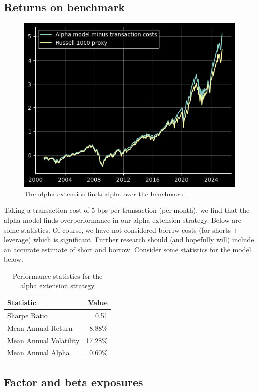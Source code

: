 \documentclass[12pt]{article}
\begin{document}
\subsection{Returns on benchmark}
\begin{figure}[H]
    \centering
    \includegraphics[width=13cm]{./static/returns.png}
    \caption{The alpha extension finds alpha over the benchmark}
    \label{fig:momentum_rank_ic}
\end{figure}
Taking a transaction cost of 5 bps per transaction (per-month), we find that the alpha model finds 
overperformance in our alpha extension strategy. Below are some statistics. Of course, we have not 
considered borrow costs (for shorts + leverage) which is significant. Further research should (and hopefully
will) include an accurate estimate of short and borrow. Consider some statistics for the model below.
\begin{table}[h!]
\centering
\begin{tabular}{l r}
\hline
\textbf{Statistic} & \textbf{Value} \\
\hline
Sharpe Ratio            & 0.51   \\
Mean Annual Return      & 8.88\% \\
Mean Annual Volatility  & 17.28\% \\
Mean Annual Alpha & 0.60\% \\
\hline
\end{tabular}
\caption{Performance statistics for the alpha extension strategy}
\label{tab:performance_stats}
\end{table}
\subsection{Factor and beta exposures}
\end{document}
